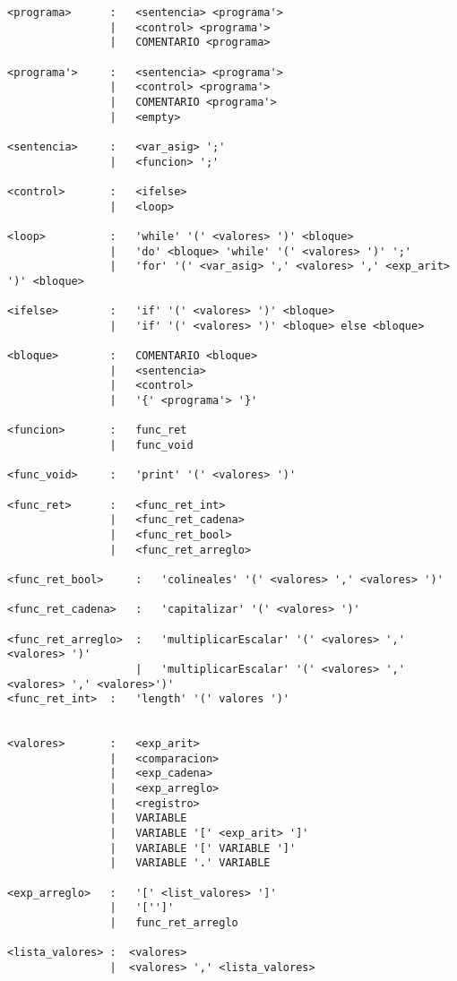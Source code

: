 \begin{verbatim}
<programa>      :   <sentencia> <programa'>   
                |   <control> <programa'>   
                |   COMENTARIO <programa>   

<programa'>     :   <sentencia> <programa'>   
                |   <control> <programa'>   
                |   COMENTARIO <programa'>   
                |   <empty>

<sentencia>     :   <var_asig> ';'
                |   <funcion> ';'

<control>       :   <ifelse>
                |   <loop>

<loop>          :   'while' '(' <valores> ')' <bloque>
                |   'do' <bloque> 'while' '(' <valores> ')' ';' 
                |   'for' '(' <var_asig> ',' <valores> ',' <exp_arit> ')' <bloque>

<ifelse>        :   'if' '(' <valores> ')' <bloque>
                |   'if' '(' <valores> ')' <bloque> else <bloque>

<bloque>        :   COMENTARIO <bloque>
                |   <sentencia>
                |   <control>
                |   '{' <programa'> '}'

<funcion>       :   func_ret
                |   func_void

<func_void>     :   'print' '(' <valores> ')'

<func_ret>      :   <func_ret_int>
                |   <func_ret_cadena>
                |   <func_ret_bool>
                |   <func_ret_arreglo>

<func_ret_bool>     :   'colineales' '(' <valores> ',' <valores> ')'

<func_ret_cadena>   :   'capitalizar' '(' <valores> ')'

<func_ret_arreglo>  :   'multiplicarEscalar' '(' <valores> ',' <valores> ')'
                    |   'multiplicarEscalar' '(' <valores> ',' <valores> ',' <valores>')'
<func_ret_int>  :   'length' '(' valores ')'


<valores>       :   <exp_arit>
                |   <comparacion>
                |   <exp_cadena>
                |   <exp_arreglo>
                |   <registro>
                |   VARIABLE
                |   VARIABLE '[' <exp_arit> ']' 
                |   VARIABLE '[' VARIABLE ']' 
                |   VARIABLE '.' VARIABLE 

<exp_arreglo>   :   '[' <list_valores> ']'
                |   '['']'
                |   func_ret_arreglo

<lista_valores> :  <valores>
                |  <valores> ',' <lista_valores>


\end{verbatim}
